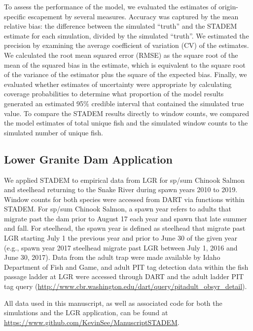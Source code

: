 \documentclass[
  12pt,
]{article}
\begin{document}
To assess the performance of the model, we evaluated the estimates of origin-specific escapement by several measures. Accuracy was captured by the mean relative bias: the difference between the simulated ``truth'' and the STADEM estimate for each simulation, divided by the simulated ``truth''. We estimated the precision by examining the average coefficient of variation (CV) of the estimates. We calculated the root mean squared error (RMSE) as the square root of the mean of the squared bias in the estimate, which is equivalent to the square root of the variance of the estimator plus the square of the expected bias. Finally, we evaluated whether estimates of uncertainty were appropriate by calculating coverage probabilities to determine what proportion of the model results generated an estimated 95\% credible interval that contained the simulated true value. To compare the STADEM results directly to window counts, we compared the model estimates of total unique fish and the simulated window counts to the simulated number of unique fish.

\hypertarget{lower-granite-dam-application}{%
\subsection{Lower Granite Dam Application}\label{lower-granite-dam-application}}

We applied STADEM to empirical data from LGR for sp/sum Chinook Salmon and steelhead returning to the Snake River during spawn years 2010 to 2019. Window counts for both species were accessed from DART via functions within STADEM. For sp/sum Chinook Salmon, a spawn year refers to adults that migrate past the dam prior to August 17 each year and spawn that late summer and fall. For steelhead, the spawn year is defined as steelhead that migrate past LGR starting July 1 the previous year and prior to June 30 of the given year (e.g., spawn year 2017 steelhead migrate past LGR between July 1, 2016 and June 30, 2017). Data from the adult trap were made available by Idaho Department of Fish and Game, and adult PIT tag detection data within the fish passage ladder at LGR were accessed through DART and the adult ladder PIT tag query (\url{http://www.cbr.washington.edu/dart/query/pitadult_obsyr_detail}).

All data used in this manuscript, as well as associated code for both the simulations and the LGR application, can be found at \href{\%5Bhttps://www.github.com/KevinSee/ManuscriptSTADEM\%5D}{https://www.github.com/KevinSee/ManuscriptSTADEM}.
\end{document}
